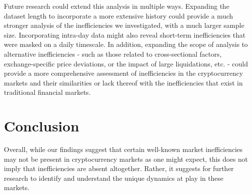 \documentclass[
]{article}
\begin{document}
Future research could extend this analysis in multiple ways. Expanding
the dataset length to incorporate a more extensive history could provide
a much stronger analysis of the inefficiencies we investigated, with a
much larger sample size. Incorporating intra-day data might also reveal
short-term inefficiencies that were masked on a daily timescale. In
addition, expanding the scope of analysis to alternative inefficiencies
- such as those related to cross-sectional factors, exchange-specific
price deviations, or the impact of large liquidations, etc. - could
provide a more comprehensive assessment of inefficiencies in the
cryptocurrency markets and their similarities or lack thereof with the
inefficiencies that exist in traditional financial markets.

\section{Conclusion}\label{conclusion}

Overall, while our findings suggest that certain well-known market
inefficiencies may not be present in cryptocurrency markets as one might
expect, this does not imply that inefficiencies are absent altogether.
Rather, it suggests for further research to identify and understand the
unique dynamics at play in these markets.
\end{document}
